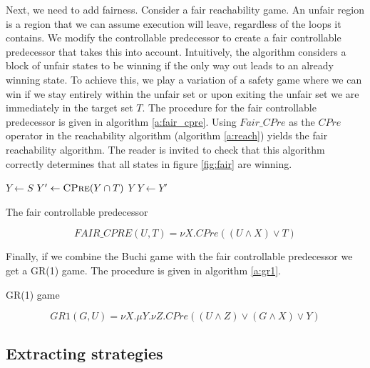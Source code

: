 \documentclass{book}
\theoremstyle{definition}
\begin{document}
Next, we need to add fairness. Consider a fair reachability game. An unfair region is a region that we can assume execution will leave, regardless of the loops it contains. We modify the controllable predecessor to create a fair controllable predecessor that takes this into account. Intuitively, the algorithm considers a block of unfair states to be winning if the only way out leads to an already winning state. To achieve this, we play a variation of a safety game where we can win if we stay entirely within the unfair set or upon exiting the unfair set we are immediately in the target set $T$. The procedure for the fair controllable predecessor is given in algorithm \ref{a:fair_cpre}. Using $Fair\_CPre$ as the $CPre$ operator in the reachability algorithm (algorithm \ref{a:reach}) yields the fair reachability algorithm. The reader is invited to check that this algorithm correctly determines that all states in figure \ref{fig:fair} are winning.

\begin{algorithm}[t]
\begin{algorithmic}
\State $Y \gets S$
\Loop
\State $Y' \gets \Call{CPre}{Y \cap T}$
\State\Return $Y$\EndIf
\State $Y \gets Y'$
\EndLoop
\EndFunction
\end{algorithmic}
\caption{The fair controllable predecessor}
\label{a:fair_cpre}
\end{algorithm}

\begin{equation}
FAIR\_CPRE(U, T) = \nu X. CPre((U \wedge X) \vee T)
\label{eqn:mu_fair}
\end{equation}

Finally, if we combine the Buchi game with the fair controllable predecessor we get a GR(1) game. The procedure is given in algorithm \ref{a:gr1}.

\begin{algorithm}[t]
\begin{algorithmic}
\State\Return {}
\EndFunction
\end{algorithmic}
\caption{GR(1) game}
\label{a:gr1}
\end{algorithm}

\begin{equation}
GR1(G, U) = \nu X. \mu Y. \nu Z. CPre((U \wedge Z) \vee (G \wedge X) \vee Y)
\label{equ:mu_gr1}
\end{equation}

\subsection{Extracting strategies}
\end{document}
